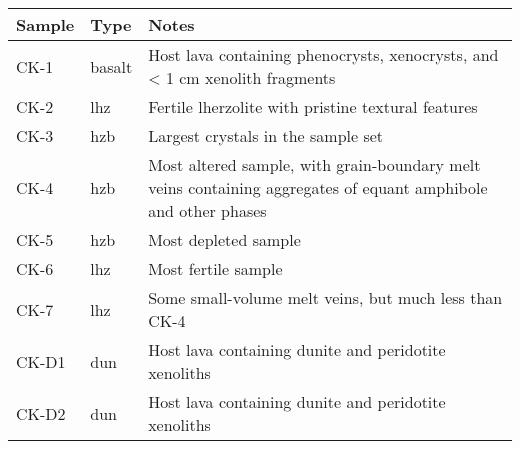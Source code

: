 \begin{tabularx}{\textwidth}{l l X}
\toprule
  Sample & Type & Notes \\
\midrule
  CK-1 & basalt & Host lava containing phenocrysts, xenocrysts, and < 1 cm xenolith fragments \\
  CK-2 & lhz & Fertile lherzolite with pristine textural features \\
  CK-3 & hzb & Largest crystals in the sample set \\
  CK-4 & hzb & Most altered sample, with grain-boundary melt veins containing aggregates of equant amphibole and other phases \\
  CK-5 & hzb & Most depleted sample \\
  CK-6 & lhz & Most fertile sample \\
  CK-7 & lhz & Some small-volume melt veins, but much less than CK-4 \\
  CK-D1 & dun & Host lava containing dunite and peridotite xenoliths \\
  CK-D2 & dun & Host lava containing dunite and peridotite xenoliths \\
\bottomrule
\end{tabularx}
